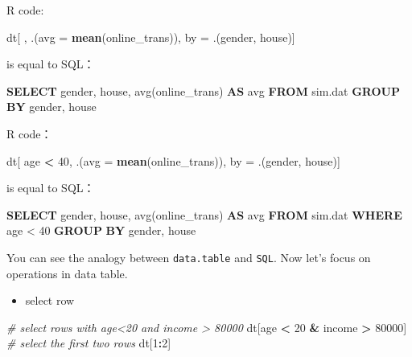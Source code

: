 \documentclass[12pt,]{krantz}
\makeatletter
\newenvironment{Shaded}{\begin{snugshade}}{\end{snugshade}}
\newcommand{\KeywordTok}[1]{\textcolor[rgb]{0.27,0.27,0.27}{\textbf{#1}}}
\newcommand{\DataTypeTok}[1]{\textcolor[rgb]{0.27,0.27,0.27}{#1}}
\newcommand{\DecValTok}[1]{\textcolor[rgb]{0.06,0.06,0.06}{#1}}
\newcommand{\StringTok}[1]{\textcolor[rgb]{0.5,0.5,0.5}{#1}}
\newcommand{\CommentTok}[1]{\textcolor[rgb]{0.37,0.37,0.37}{\textit{#1}}}
\newcommand{\FunctionTok}[1]{\textcolor[rgb]{0,0,0}{#1}}
\newcommand{\OperatorTok}[1]{\textcolor[rgb]{0.43,0.43,0.43}{\textbf{#1}}}
\newcommand{\NormalTok}[1]{#1}
\providecommand{\tightlist}{%
  \setlength{\itemsep}{0pt}\setlength{\parskip}{0pt}}
\newenvironment{kframe}{%
\medskip{}
\setlength{\fboxsep}{.8em}
 \def\at@end@of@kframe{}%
 \ifinner\ifhmode%
  \def\at@end@of@kframe{\end{minipage}}%
  \begin{minipage}{\columnwidth}%
 \fi\fi%
 \def\FrameCommand##1{\hskip\@totalleftmargin \hskip-\fboxsep
 \colorbox{shadecolor}{##1}\hskip-\fboxsep
     \hskip-\linewidth \hskip-\@totalleftmargin \hskip\columnwidth}%
 \MakeFramed {\advance\hsize-\width
   \@totalleftmargin\z@ \linewidth\hsize
   \@setminipage}}%
 {\par\unskip\endMakeFramed%
 \at@end@of@kframe}
\renewenvironment{Shaded}{\begin{kframe}}{\end{kframe}}
\theoremstyle{definition}
\theoremstyle{definition}
\theoremstyle{definition}
\theoremstyle{remark}
\makeatother
\begin{document}
R code:

\begin{Shaded}
\begin{Highlighting}[]
\NormalTok{dt[ , .(}\DataTypeTok{avg =} \KeywordTok{mean}\NormalTok{(online_trans)), by =}\StringTok{ }\NormalTok{.(gender, house)]}
\end{Highlighting}
\end{Shaded}

is equal to SQL：

\begin{Shaded}
\begin{Highlighting}[]
\KeywordTok{SELECT}\NormalTok{ gender, house, }\FunctionTok{avg}\NormalTok{(online_trans) }\KeywordTok{AS} \FunctionTok{avg} \KeywordTok{FROM}\NormalTok{ sim.dat }\KeywordTok{GROUP} \KeywordTok{BY}\NormalTok{ gender, house}
\end{Highlighting}
\end{Shaded}

R code：

\begin{Shaded}
\begin{Highlighting}[]
\NormalTok{dt[ age }\OperatorTok{<}\StringTok{ }\DecValTok{40}\NormalTok{, .(}\DataTypeTok{avg =} \KeywordTok{mean}\NormalTok{(online_trans)), by =}\StringTok{ }\NormalTok{.(gender, house)]}
\end{Highlighting}
\end{Shaded}

is equal to SQL：

\begin{Shaded}
\begin{Highlighting}[]
\KeywordTok{SELECT}\NormalTok{ gender, house, }\FunctionTok{avg}\NormalTok{(online_trans) }\KeywordTok{AS} \FunctionTok{avg} \KeywordTok{FROM}\NormalTok{ sim.dat }\KeywordTok{WHERE}\NormalTok{ age < }\DecValTok{40} \KeywordTok{GROUP} \KeywordTok{BY}\NormalTok{ gender, house}
\end{Highlighting}
\end{Shaded}

You can see the analogy between \texttt{data.table} and \texttt{SQL}.
Now let's focus on operations in data table.

\begin{itemize}
\tightlist
\item
  select row
\end{itemize}

\begin{Shaded}
\begin{Highlighting}[]
\CommentTok{# select rows with age<20 and income > 80000}
\NormalTok{dt[age }\OperatorTok{<}\StringTok{ }\DecValTok{20} \OperatorTok{&}\StringTok{ }\NormalTok{income }\OperatorTok{>}\StringTok{ }\DecValTok{80000}\NormalTok{]}
\CommentTok{# select the first two rows}
\NormalTok{dt[}\DecValTok{1}\OperatorTok{:}\DecValTok{2}\NormalTok{]}
\end{Highlighting}
\end{Shaded}
\end{document}
